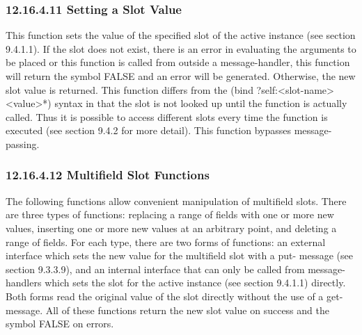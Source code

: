 \documentclass[letterpaper,10pt,english]{sphinxmanual}
\begin{document}
\subsubsection{12.16.4.11 Setting a Slot Value}
\label{\detokenize{actions:setting-a-slot-value}}
This function sets the value of the specified slot of the active
instance (see section 9.4.1.1). If the slot does not exist, there is an
error in evaluating the arguments to be placed or this function is
called from outside a message-handler, this function will return the
symbol FALSE and an error will be generated. Otherwise, the new slot
value is returned. This function differs from the (bind
?self:\textless{}slot-name\textgreater{} \textless{}value\textgreater{}*) syntax in that the slot is not looked up
until the function is actually called. Thus it is possible to access
different slots every time the function is executed (see section 9.4.2
for more detail). This function bypasses message-passing.


\begin{sphinxVerbatim}[commandchars=\\\{\}]
  
\end{sphinxVerbatim}


\subsubsection{12.16.4.12 Multifield Slot Functions}
\label{\detokenize{actions:multifield-slot-functions}}
The following functions allow convenient manipulation of multifield
slots. There are three types of functions: replacing a range of fields
with one or more new values, inserting one or more new values at an
arbitrary point, and deleting a range of fields. For each type, there
are two forms of functions: an external interface which sets the new
value for the multifield slot with a put- message (see section 9.3.3.9),
and an internal interface that can only be called from message-handlers
which sets the slot for the active instance (see section 9.4.1.1)
directly. Both forms read the original value of the slot directly
without the use of a get- message. All of these functions return the new
slot value on success and the symbol FALSE on errors.
\end{document}
